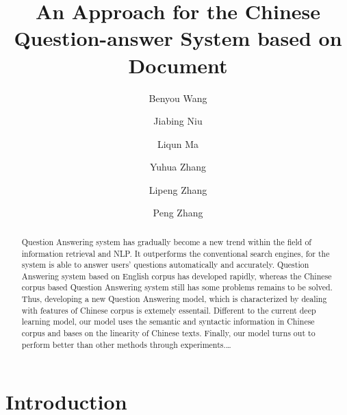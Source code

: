 \documentclass{llncs}
\begin{document}
\title{An Approach for the Chinese Question-answer System based on Document}
%
%
\author{Benyou Wang \and Jiabing Niu \and Liqun Ma \and Yuhua Zhang \and Lipeng Zhang 
\and Peng Zhang}
%
%
%


\maketitle              %



\begin{abstract}
Question Answering system has gradually become a new trend within the field of information retrieval and NLP. It outperforms the conventional search engines, for the system is able to answer users’ questions automatically and accurately. Question Answering system based on English corpus has developed rapidly, whereas the Chinese corpus based Question Answering system still has some problems remains to be solved. Thus, developing a new Question Answering model, which is characterized by dealing with features of Chinese corpus is extemely essentail. Different to the current deep learning model, our model uses the semantic and syntactic information in Chinese corpus and bases on the linearity of Chinese texts. Finally, our model turns out to perform better than other methods through experiments.\dots
{}
\end{abstract}
%
\section{Introduction}
\end{document}
